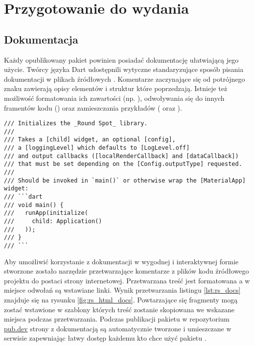 \section{Przygotowanie do wydania}

\subsection{Dokumentacja}
Każdy opublikowany pakiet powinien posiadać dokumentację ułatwiającą jego użycie. Twórcy języka Dart udostępnili wytyczne standaryzujące sposób pisania dokumentacji w plikach źródłowych \cite{Dart_Doc_Guidelines}. Komentarze zaczynające się od potrójnego znaku \codeinline{///} zawierają opisy elementów i struktur które poprzedzają. Istnieje też możliwość formatowania ich zawartości (np. ), odwoływania się do innych framentów kodu () oraz zamieszczania przykładów ( oraz ).

\begin{lstlisting}[language=dartcomment,caption={Fragment dokumentacji zawartej w kodzie źródłowym pakietu},label=lst:rs_docs]
/// Initializes the _Round Spot_ library.
///
/// Takes a [child] widget, an optional [config],
/// a [loggingLevel] which defaults to [LogLevel.off]
/// and output callbacks ([localRenderCallback] and [dataCallback]) 
/// that must be set depending on the [Config.outputType] requested.
///
/// Should be invoked in `main()` or otherwise wrap the [MaterialApp] widget:
/// ```dart
/// void main() {
///   runApp(initialize(
///     child: Application()
///   ));
/// }
/// ```
\end{lstlisting}

Aby umożliwić korzystanie z dokumentacji w wygodnej i interaktywnej formie stworzone zostało narzędzie  \cite{Dart_Doc} przetwarzające komentarze z plików kodu źródłowego projektu do postaci strony internetowej. Przetwarzana treść jest formatowana a w miejsce odwołań są wstawiane linki. Wynik przetwarzania listingu \ref{lst:rs_docs} znajduje się na rysunku \ref{fig:rs_html_docs}. Powtarzające się fragmenty mogą zostać wstawione w szablony których treść zostanie skopiowana we wskazane miejsca podczas przetwarzania. Podczas publikacji pakietu w repozytorium \href{https://pub.dev/}{pub.dev} strony z dokumentacją są automatycznie tworzone i umieszczane w serwisie zapewniając łatwy dostęp każdemu kto chce użyć pakietu \cite{RS_Documentation}.

